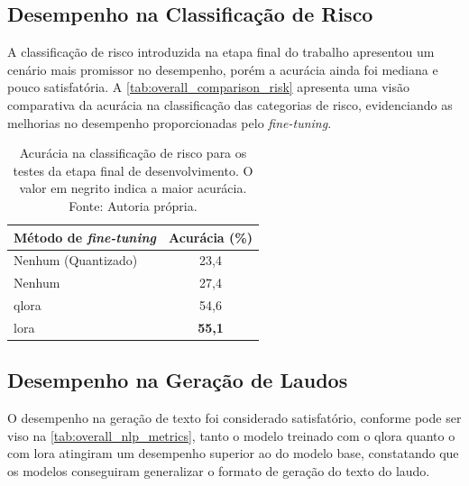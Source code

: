 \subsection{Desempenho na Classificação de Risco}

A classificação de risco introduzida na etapa final do trabalho apresentou um cenário mais promissor no desempenho,
porém a acurácia ainda foi mediana e pouco satisfatória. A \autoref{tab:overall_comparison_risk} apresenta uma visão
comparativa da acurácia na classificação das categorias de risco, evidenciando as melhorias no desempenho
proporcionadas pelo \textit{fine-tuning}.

\begin{table}[ht]
    \centering
    \begin{tabular}{l|c}
        \hline
        Método de \textit{fine-tuning} & Acurácia (\%) \\ \hline
        Nenhum (Quantizado)            & 23,4          \\
        Nenhum                         & 27,4          \\
        \ac{qlora}                     & 54,6          \\
        \ac{lora}                      & \textbf{55,1} \\ \hline
    \end{tabular}
    \label{tab:overall_comparison_risk}
    \caption{Acurácia na classificação de risco para os testes da etapa final de desenvolvimento. O valor em
    negrito indica a maior acurácia. Fonte: Autoria própria.}
\end{table}

\subsection{Desempenho na Geração de Laudos}

O desempenho na geração de texto foi considerado satisfatório, conforme pode ser viso na
\autoref{tab:overall_nlp_metrics}, tanto o modelo treinado com o \ac{qlora} quanto o com \ac{lora} atingiram um
desempenho superior ao do modelo base, constatando que os modelos conseguiram generalizar o formato de geração do texto
do laudo.

\clearpage

